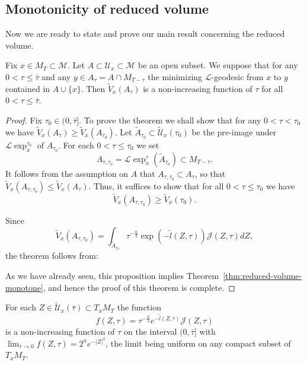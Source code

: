 \subsection{Monotonicity of reduced volume}

Now we are ready to state and prove our main result concerning the
reduced volume.




\begin{theorem}\label{thm:reduced-volume-monotone}
\label{Amono}
Fix $x\in M_T\subset {\mathcal M}$. Let $A\subset{\mathcal
U}_x\subset {\mathcal M}$ be an open  subset. We suppose that for
any $0<\tau\le \bar\tau$ and any $y\in A_\tau=A\cap M_{T-\tau}$ the
minimizing ${\mathcal L}$-geodesic from $x$ to $y$ contained in
$A\cup \{x\}$.  Then $\widetilde V_x(A_\tau)$ is a non-increasing
function of $\tau$ for all $0<\tau\le \bar\tau$.
\end{theorem}





\begin{proof}
\sketch
Fix $\tau_0\in (0,\bar\tau]$. To prove the theorem we shall show
that for any $0<\tau<\tau_0$ we have $\widetilde V_x(A_\tau)\ge
\widetilde V_x(A_{\tau_0})$. Let $\widetilde A_{\tau_0}\subset
\widetilde {\mathcal U}_x(\tau_0)$ be the pre-image under ${\mathcal
L}\exp_x^{\tau_0}$ of $A_{\tau_0}$. For each $0<\tau\le \tau_0$
we set
$$A_{\tau,\tau_0}={\mathcal L}\exp_x^\tau(\widetilde
A_{\tau_0})\subset M_{T-\tau}.$$ It follows from the assumption on
$A$ that $A_{\tau,\tau_0}\subset A_\tau$, so that $\widetilde
V_x(A_{\tau,\tau_0})\le \widetilde V_x(A_\tau)$. Thus, it suffices
to show that for all $0<\tau\le \tau_0$ we have
$$\widetilde V_x(A_{\tau,\tau_0})\ge \widetilde V_x(\tau_0).$$

Since
$$ \widetilde V_x(A_{\tau,\tau_0})=\int_{\widetilde A_{\tau_0}} \tau^{-\frac{n}{2}}
\exp(-\tilde l(Z,\tau)){\mathcal J}(Z,\tau)dZ,$$ the theorem
follows from:





As we have already seen, this proposition implies
 Theorem~\ref{thm:reduced-volume-monotone}, and hence the proof of this theorem is complete.
\end{proof}

\begin{proposition}\label{prop:reduced-volume-integrand-monotone}
\label{fmonotone}
For each $Z\in \widetilde
{\mathcal U}_x(\bar\tau)\subset T_xM_T$ the function
$$f(Z,\tau)=\tau^{-\frac{n}{2}}e^{-\tilde l(Z,\tau)}{\mathcal J}(Z,\tau)$$
is a non-increasing function of $\tau$ on the interval
$(0,\bar\tau]$ with $\lim_{\tau\rightarrow
0}f(Z,\tau)=2^ne^{-|Z|^2}$, the limit being uniform on any compact
subset of $T_xM_T$.
\end{proposition}




